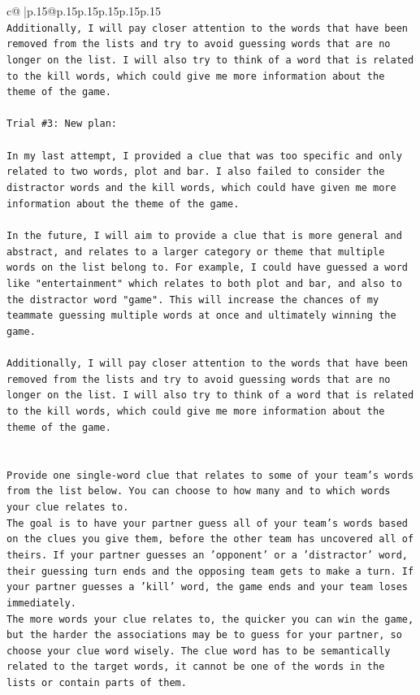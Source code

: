 \documentclass{article}
\begin{document}
{\begin{supertabular}{c@{$\;$}|p{.15\linewidth}@{}p{.15\linewidth}p{.15\linewidth}p{.15\linewidth}p{.15\linewidth}p{.15\linewidth}}
{{{\\ 
\texttt{Additionally, I will pay closer attention to the words that have been removed from the lists and try to avoid guessing words that are no longer on the list. I will also try to think of a word that is related to the kill words, which could give me more information about the theme of the game.} \\
\\ 
\texttt{Trial \#3: New plan: } \\
\\ 
\texttt{In my last attempt, I provided a clue that was too specific and only related to two words, plot and bar. I also failed to consider the distractor words and the kill words, which could have given me more information about the theme of the game. } \\
\\ 
\texttt{In the future, I will aim to provide a clue that is more general and abstract, and relates to a larger category or theme that multiple words on the list belong to. For example, I could have guessed a word like "entertainment" which relates to both plot and bar, and also to the distractor word "game". This will increase the chances of my teammate guessing multiple words at once and ultimately winning the game. } \\
\\ 
\texttt{Additionally, I will pay closer attention to the words that have been removed from the lists and try to avoid guessing words that are no longer on the list. I will also try to think of a word that is related to the kill words, which could give me more information about the theme of the game.} \\
\\ 
\\ 
\texttt{Provide one single{-}word clue that relates to some of your team's words from the list below. You can choose to how many and to which words your clue relates to.} \\
\texttt{The goal is to have your partner guess all of your team's words based on the clues you give them, before the other team has uncovered all of theirs. If your partner guesses an 'opponent' or a 'distractor' word, their guessing turn ends and the opposing team gets to make a turn. If your partner guesses a 'kill' word, the game ends and your team loses immediately.} \\
\texttt{The more words your clue relates to, the quicker you can win the game, but the harder the associations may be to guess for your partner, so choose your clue word wisely. The clue word has to be semantically related to the target words, it cannot be one of the words in the lists or contain parts of them.} \\
}}}
\end{supertabular}}
\end{document}
